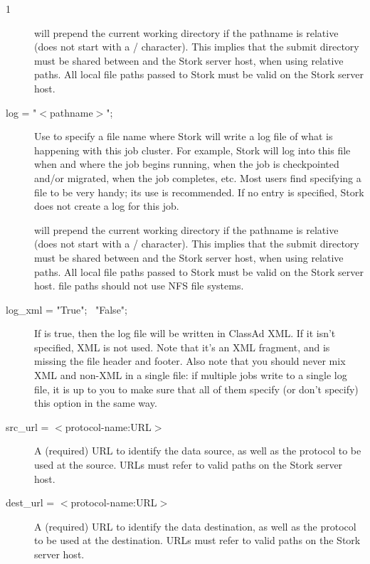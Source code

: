 \begin{ManPage}{\label{man-stork-submit}}{1}
\begin{description}
 will prepend the current working directory if the pathname is
relative (does not start with a / character).  This implies that the submit
directory must be shared between  and the Stork server host, when
using relative paths.  All local file paths passed to Stork must be valid on
the Stork server host.


\item[log = "$<$pathname$>$";]
Use  to specify a file name where
Stork will write a log file of what is happening with this job cluster.
For example, Stork will log into this file when and where the job
begins running, when the job is checkpointed and/or migrated, when the
job completes, etc. Most users find specifying a  file to be very
handy; its use is recommended. If no  entry is specified, 
Stork does not create a log for this job.

 will prepend the current working directory if the pathname is
relative (does not start with a / character).  This implies that the submit
directory must be shared between  and the Stork server host, when
using relative paths.  All local file paths passed to Stork must be valid on
the Stork server host.
 file paths should not use NFS file systems.

\item[log\_xml = "True"; \Bar\ "False";]
If  is true, 
then the log file will be written in ClassAd XML. If it isn't
specified, XML is not used. Note that it's an XML fragment, and is
missing the file header and footer. Also note that you should never
mix XML and non-XML in a single file: if multiple jobs write to a
single log file, it is up to you to make sure that all of them specify
(or don't specify) this option in the same way.
\item[src\_url = $<$protocol-name:URL$>$]
A (required) URL to identify the data source, 
as well as the protocol to be used at the source.
 URLs must refer to valid paths on the Stork server host.

\item[dest\_url = $<$protocol-name:URL$>$]
A (required) URL to identify the data destination, 
as well as the protocol to be used at the destination.
 URLs must refer to valid paths on the Stork server host.


\end{description}
\end{ManPage}
